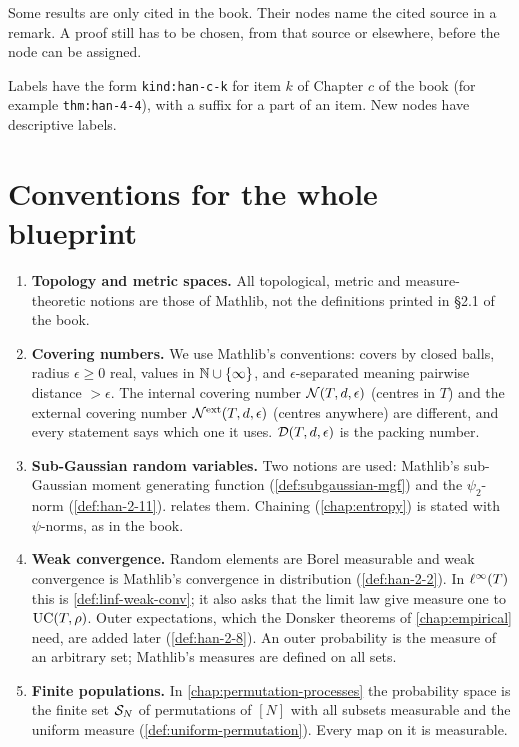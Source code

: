 Some results are only cited in the book. Their nodes name the cited source in a remark. A proof still has to be chosen, from that source or elsewhere, before the node can be assigned.

Labels have the form \texttt{kind:han-c-k} for item $k$ of Chapter $c$ of the book (for example \texttt{thm:han-4-4}), with a suffix for a part of an item. New nodes have descriptive labels.

\section{Conventions for the whole blueprint}

\begin{enumerate}
  \item \textbf{Topology and metric spaces.} All topological, metric and measure-theoretic notions are those of Mathlib, not the definitions printed in \S2.1 of the book.
  \item \textbf{Covering numbers.} We use Mathlib's conventions: covers by closed balls, radius $\epsilon\ge0$ real, values in $\mathbb{N}\cup\{\infty\}$, and $\epsilon$-separated meaning pairwise distance $>\epsilon$. The internal covering number $\mathcal{N}(T,d,\epsilon)$ (centres in $T$) and the external covering number $\mathcal{N}^{\mathrm{ext}}(T,d,\epsilon)$ (centres anywhere) are different, and every statement says which one it uses. $\mathcal{D}(T,d,\epsilon)$ is the packing number.
  \item \textbf{Sub-Gaussian random variables.} Two notions are used: Mathlib's sub-Gaussian moment generating function (\cref{def:subgaussian-mgf}) and the $\psi_2$-norm (\cref{def:han-2-11}).  relates them. Chaining (\cref{chap:entropy}) is stated with $\psi$-norms, as in the book.
  \item \textbf{Weak convergence.} Random elements are Borel measurable and weak convergence is Mathlib's convergence in distribution (\cref{def:han-2-2}). In $\ell^\infty(T)$ this is \cref{def:linf-weak-conv}; it also asks that the limit law give measure one to $\mathrm{UC}(T,\rho)$. Outer expectations, which the Donsker theorems of \cref{chap:empirical} need, are added later (\cref{def:han-2-8}). An outer probability is the measure of an arbitrary set; Mathlib's measures are defined on all sets.
  \item \textbf{Finite populations.} In \cref{chap:permutation-processes} the probability space is the finite set $\mathcal{S}_N$ of permutations of $[N]$ with all subsets measurable and the uniform measure (\cref{def:uniform-permutation}). Every map on it is measurable.

\end{enumerate}
